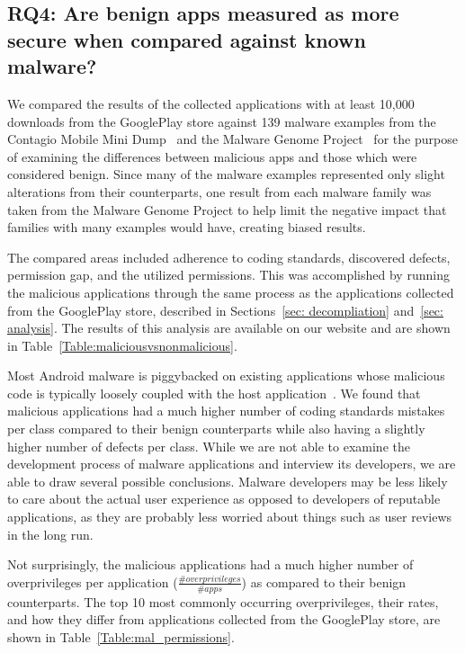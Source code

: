 \documentclass[conference]{IEEEtran}
\begin{document}
\subsection{RQ4: Are benign apps measured as more secure when compared against known malware?}

We compared the results of the collected applications with at least 10,000 downloads from the GooglePlay store against 139 malware examples from the Contagio Mobile Mini Dump~\cite{contagio_url} and the Malware Genome Project~\cite{Zhou:2012:DAM:2310656.2310710} for the purpose of examining the differences between malicious apps and those which were considered benign. Since many of the malware examples represented only slight alterations from their counterparts, one result from each malware family was taken from the Malware Genome Project to help limit the negative impact that families with many examples would have, creating biased results.

The compared areas included adherence to coding standards, discovered defects, permission gap, and the utilized permissions. This was accomplished by running the malicious applications through the same process as the applications collected from the GooglePlay store, described in Sections~\ref{sec: decompliation} and~\ref{sec: analysis}. The results of this analysis are available on our website and are shown in Table~\ref{Table:maliciousvsnonmalicious}.

Most Android malware is piggybacked on existing applications whose malicious code is typically loosely coupled with the host application~\cite{Zhou:2012:DAM:2310656.2310710, Deshotels:2014:DAF:2556464.2556467}. We found that malicious applications had a much higher number of coding standards mistakes per class compared to their benign counterparts while also having a slightly higher number of defects per class. While we are not able to examine the development process of malware applications and interview its developers, we are able to draw several possible conclusions. Malware developers may be less likely to care about the actual user experience as opposed to developers of reputable applications, as they are probably less worried about things such as user reviews in the long run.


Not surprisingly, the malicious applications had a much higher number of overprivileges per application ($\frac{\#overprivileges}{\# apps} $) as compared to their benign counterparts. The top 10 most commonly occurring overprivileges, their rates, and how they differ from applications collected from the GooglePlay store, are shown in Table~\ref{Table:mal_permissions}.
\end{document}
